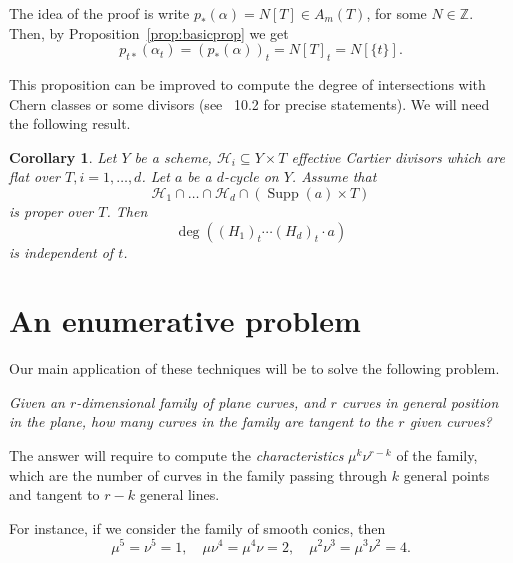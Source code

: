 \documentclass[leqno, openany]{memoir}
\newtheorem{cor}[thm]{Corollary}
\theoremstyle{definition}
\theoremstyle{remark}
\theoremstyle{plain}
\theoremstyle{definition}
\theoremstyle{remark}
\newcommand{\Z}{\mathbb{Z}}
\newcommand{\mc}[1]{\mathcal{#1}}
\DeclareMathOperator{\Supp}{Supp}
\begin{document}
The idea of the proof is write $p_\ast(\alpha)=N[T] \in A_m(T)$, for some $N
\in \Z$. Then, by Proposition~\ref{prop:basicprop} we get \[
p_{t\ast}(\alpha_t)={ (p_\ast(\alpha)) }_t = { N[T] }_t= N[\{t\}]. \]

This proposition can be improved to compute the degree of intersections with
Chern classes or some divisors (see \textsection~10.2 for precise statements).
We will need the following result.

\begin{cor} Let $Y$ be a scheme, $\mc{H}_i \subseteq Y \times T$ effective
    Cartier divisors which are flat over $T, i=1, \dots, d$. Let $a$ be a
    $d$-cycle on $Y$. Assume that \[ \mc{H}_1 \cap \dots \cap \mc{H}_d \cap
    (\Supp(a) \times T) \] is proper over $T$. Then \[ \deg({ (H_1) }_t \cdots
{ (H_d) }_t \cdot a) \] is independent of $t$.  \end{cor}

\section{An enumerative problem}

Our main application of these techniques will be to solve the following
problem.  \begin{center} \emph{Given an $r$-dimensional family of plane curves,
    and $r$ curves in general position in the plane, how many curves in the
family are tangent to the $r$ given curves?} \end{center}

The answer will require to compute the \emph{characteristics} $\mu^k \nu^{r-k}$
of the family, which are the number of curves in the family passing through $k$
general points and tangent to $r-k$ general lines. 

For instance, if we consider the family of smooth conics, then \[ \mu^5 = \nu^5
= 1, \quad \mu\nu^4=\mu^4\nu=2, \quad \mu^2\nu^3=\mu^3\nu^2=4. \]
\end{document}

